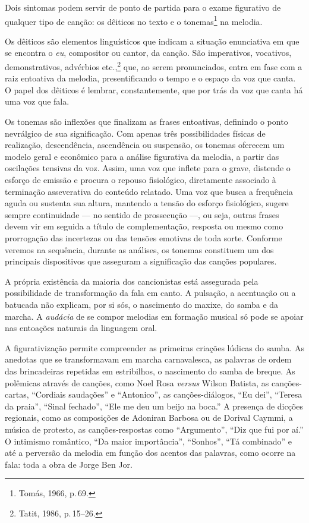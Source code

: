Dois sintomas podem servir de ponto de partida para o exame figurativo
de qualquer tipo de canção: os dêiticos no texto e o tonemas\footnote{Tomás,
1966, p.\,69.} na melodia.

Os dêiticos são elementos linguísticos que indicam a situação
enunciativa em que se encontra o \textit{eu}, compositor ou cantor, da canção.
São imperativos, vocativos, demonstrativos, advérbios etc.,\footnote{Tatit, 1986, p.\,15--26.} que, ao serem pronunciados, entra em fase com a raiz
entoativa da melodia, presentificando o tempo e o espaço da voz que
canta. O papel dos dêiticos é lembrar, constantemente, que por trás da
voz que canta há uma voz que fala.

Os tonemas são inflexões que finalizam as frases entoativas, definindo o
ponto nevrálgico de sua significação. Com apenas três possibilidades
físicas de realização, descendência, ascendência ou suspensão, os
tonemas oferecem um modelo geral e econômico para a análise figurativa
da melodia, a partir das oscilações tensivas da voz. Assim, uma voz que
inflete para o grave, distende o esforço de emissão e procura o repouso
fisiológico, diretamente associado à terminação asseverativa do conteúdo
relatado. Uma voz que busca a frequência aguda ou sustenta sua altura,
mantendo a tensão do esforço fisiológico, sugere sempre continuidade --- no
sentido de prossecução ---, ou seja, outras frases devem vir em seguida a
título de complementação, resposta ou mesmo como prorrogação das
incertezas ou das tensões emotivas de toda sorte. Conforme veremos na
sequência, durante as análises, os tonemas constituem um dos principais
dispositivos que asseguram a significação das canções populares.

A própria existência da maioria dos cancionistas está assegurada pela
possibilidade de transformação da fala em canto. A pulsação, a
acentuação ou a batucada não explicam, por si sós, o nascimento do
maxixe, do samba e da marcha. A \textit{audácia} de se compor melodias em
formação musical só pode se apoiar nas entoações naturais da linguagem
oral.

A figurativização permite compreender as primeiras criações lúdicas do
samba. As anedotas que se transformavam em marcha carnavalesca, as
palavras de ordem das brincadeiras repetidas em estribilhos, o
nascimento do samba de breque. As polêmicas através de canções, como Noel
Rosa \textit{versus} Wilson Batista, as canções-cartas, ``Cordiais saudações'' e
``Antonico'', as canções-diálogos, ``Eu dei'', ``Teresa da praia'', ``Sinal fechado'',
``Ele me deu um beijo na boca.'' A presença de dicções regionais, como as composições de Adoniran Barbosa ou de Dorival Caymmi, a música de
protesto, as canções-respostas como ``Argumento'', ``Diz que fui por aí.'' O
intimismo romântico, ``Da maior importância'', ``Sonhos'', ``Tá combinado'' e até a
perversão da melodia em função dos acentos das palavras, como ocorre na
fala: toda a obra de Jorge Ben Jor.

